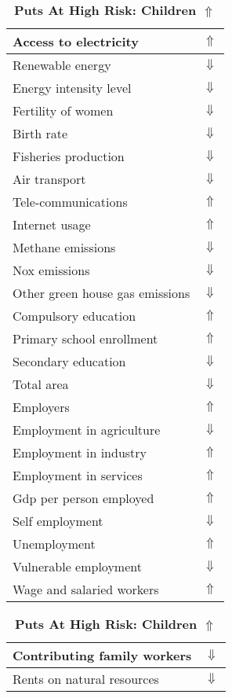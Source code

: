 \documentclass[12pt,notitlepage,oneside]{report}
\begin{document}
\clearpage
\begin{table}[!htb]
\caption{\textbf{Puts At High Risk: Children $\Uparrow$}}
\centering
\label{Correlated Socio-economic Factors0}
\begin{tabular}{|l|l|}
\hline
Access to electricity & $\Uparrow$\\ \hline
Renewable energy & $\Downarrow$\\ \hline
Energy intensity level & $\Downarrow$\\ \hline
Fertility of women & $\Downarrow$\\ \hline
Birth rate & $\Downarrow$\\ \hline
Fisheries production & $\Downarrow$\\ \hline
Air transport  & $\Downarrow$\\ \hline
Tele-communications & $\Uparrow$\\ \hline
Internet usage & $\Uparrow$\\ \hline
Methane emissions & $\Downarrow$\\ \hline
Nox emissions & $\Downarrow$\\ \hline
Other green house gas emissions & $\Downarrow$\\ \hline
Compulsory education & $\Uparrow$\\ \hline
Primary school enrollment & $\Uparrow$\\ \hline
Secondary education & $\Downarrow$\\ \hline
Total area & $\Downarrow$\\ \hline
Employers & $\Uparrow$\\ \hline
Employment in agriculture & $\Downarrow$\\ \hline
Employment in industry & $\Uparrow$\\ \hline
Employment in services & $\Uparrow$\\ \hline
Gdp per person employed & $\Uparrow$\\ \hline
Self employment & $\Downarrow$\\ \hline
Unemployment & $\Uparrow$\\ \hline
Vulnerable employment & $\Downarrow$\\ \hline
Wage and salaried workers & $\Uparrow$\\ \hline
\end{tabular}
\begin{tabular}{|l|l|}
\hline
Contributing family workers & $\Downarrow$\\ \hline
Rents on natural resources & $\Downarrow$\\ \hline

\end{tabular}
\end{table}
\end{document}
